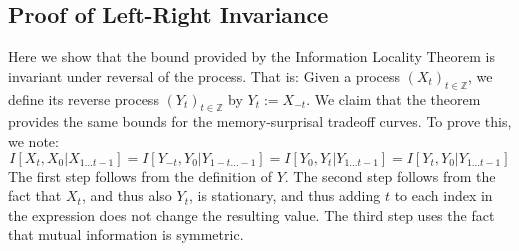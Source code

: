 \documentclass[11pt,letterpaper]{article}
\newcommand{\E}[0]{\mathbb{E}}
\newcounter{theorem}
\newtheorem{thm}[theorem]{Theorem}
\begin{document}
%


\subsection{Proof of Left-Right Invariance}

Here we show that the bound provided by the Information Locality Theorem is invariant under reversal of the process.
That is: Given a process $(X_t)_{t \in \mathbb{Z}}$, we define its reverse process $(Y_t)_{t \in \mathbb{Z}}$ by $Y_t := X_{-t}$.
We claim that the theorem provides the same bounds for the memory-surprisal tradeoff curves.
To prove this, we note:
\begin{equation}
	I[X_t, X_0|X_{1\dots t-1}] = I[Y_{-t}, Y_0|Y_{1-t\dots -1}] = I[Y_0, Y_t|Y_{1\dots t-1}] = I[Y_t, Y_0|Y_{1\dots t-1}]
\end{equation}
The first step follows from the definition of $Y$. The second step follows from the fact that $X_t$, and thus also $Y_t$, is stationary, and thus adding $t$ to each index in the expression does not change the resulting value. The third step uses the fact that mutual information is symmetric.
\end{document}
